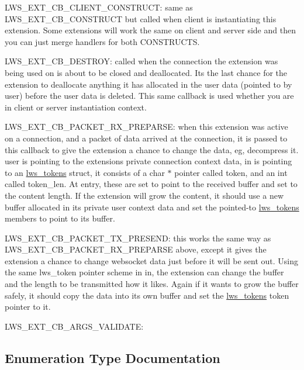 L\+W\+S\+\_\+\+E\+X\+T\+\_\+\+C\+B\+\_\+\+C\+L\+I\+E\+N\+T\+\_\+\+C\+O\+N\+S\+T\+R\+U\+CT\+: same as L\+W\+S\+\_\+\+E\+X\+T\+\_\+\+C\+B\+\_\+\+C\+O\+N\+S\+T\+R\+U\+CT but called when client is instantiating this extension. Some extensions will work the same on client and server side and then you can just merge handlers for both C\+O\+N\+S\+T\+R\+U\+C\+TS.

L\+W\+S\+\_\+\+E\+X\+T\+\_\+\+C\+B\+\_\+\+D\+E\+S\+T\+R\+OY\+: called when the connection the extension was being used on is about to be closed and deallocated. It\textquotesingle{}s the last chance for the extension to deallocate anything it has allocated in the user data (pointed to by user) before the user data is deleted. This same callback is used whether you are in client or server instantiation context.

L\+W\+S\+\_\+\+E\+X\+T\+\_\+\+C\+B\+\_\+\+P\+A\+C\+K\+E\+T\+\_\+\+R\+X\+\_\+\+P\+R\+E\+P\+A\+R\+SE\+: when this extension was active on a connection, and a packet of data arrived at the connection, it is passed to this callback to give the extension a chance to change the data, eg, decompress it. user is pointing to the extension\textquotesingle{}s private connection context data, in is pointing to an \hyperlink{structlws__tokens}{lws\+\_\+tokens} struct, it consists of a char $\ast$ pointer called token, and an int called token\+\_\+len. At entry, these are set to point to the received buffer and set to the content length. If the extension will grow the content, it should use a new buffer allocated in its private user context data and set the pointed-\/to \hyperlink{structlws__tokens}{lws\+\_\+tokens} members to point to its buffer.

L\+W\+S\+\_\+\+E\+X\+T\+\_\+\+C\+B\+\_\+\+P\+A\+C\+K\+E\+T\+\_\+\+T\+X\+\_\+\+P\+R\+E\+S\+E\+ND\+: this works the same way as L\+W\+S\+\_\+\+E\+X\+T\+\_\+\+C\+B\+\_\+\+P\+A\+C\+K\+E\+T\+\_\+\+R\+X\+\_\+\+P\+R\+E\+P\+A\+R\+SE above, except it gives the extension a chance to change websocket data just before it will be sent out. Using the same lws\+\_\+token pointer scheme in in, the extension can change the buffer and the length to be transmitted how it likes. Again if it wants to grow the buffer safely, it should copy the data into its own buffer and set the \hyperlink{structlws__tokens}{lws\+\_\+tokens} token pointer to it.

L\+W\+S\+\_\+\+E\+X\+T\+\_\+\+C\+B\+\_\+\+A\+R\+G\+S\+\_\+\+V\+A\+L\+I\+D\+A\+TE\+: 

\subsection{Enumeration Type Documentation}
\mbox{\label{group__extensions_gacc9f55936dc165257a2e1f7d47bce89e}} 
